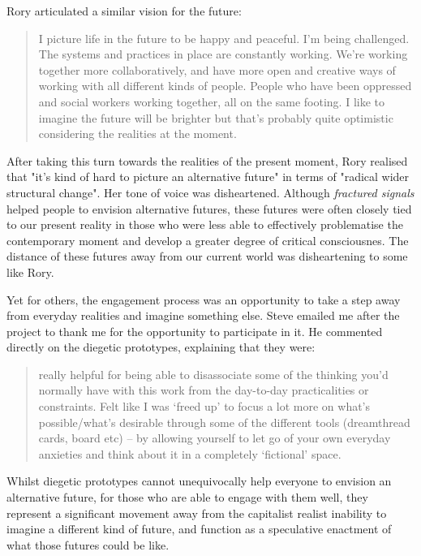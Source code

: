 Rory articulated a similar vision for the future:
\begin{quote}
 I picture life in the future to be happy and peaceful. I'm being challenged. The systems and practices in place are constantly working. We're working together more collaboratively, and have more open and creative ways of working with all different kinds of people. People who have been oppressed and social workers working together, all on the same footing. I like to imagine the future will be brighter but that's probably quite optimistic considering the realities at the moment. 
\end{quote}
After taking this turn towards the realities of the present moment, Rory realised that "it's kind of hard to picture an alternative future" in terms of "radical wider structural change". Her tone of voice was disheartened. Although \textit{fractured signals} helped people to envision alternative futures, these futures were often closely tied to our present reality in those who were less able to effectively problematise the contemporary moment and develop a greater degree of critical consciousnes. The distance of these futures away from our current world was disheartening to some like Rory.

Yet for others, the engagement process was an opportunity to take a step away from everyday realities and imagine something else. Steve emailed me after the project to thank me for the opportunity to participate in it. He commented directly on the diegetic prototypes, explaining that they were:
\begin{quote}
really helpful for being able to disassociate some of the thinking you’d normally have with this work from the day-to-day practicalities or constraints. Felt like I was ‘freed up’ to focus a lot more on what’s possible/what’s desirable through some of the different tools (dreamthread cards, board etc) – by allowing yourself to let go of your own everyday anxieties and think about it in a completely ‘fictional’ space.
\end{quote}
Whilst diegetic prototypes cannot unequivocally help everyone to envision an alternative future, for those who are able to engage with them well, they represent a significant movement away from the capitalist realist inability to imagine a different kind of future, and function as a speculative enactment of what those futures could be like.

